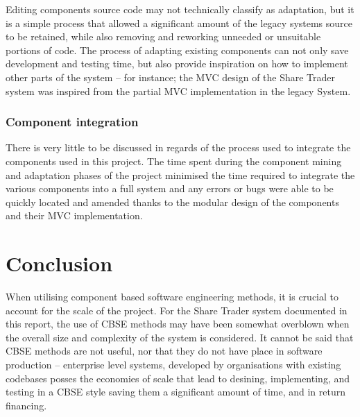 \documentclass[12pt, a4paper,titlepage]{article}
\begin{document}
Editing components source code may not technically classify as adaptation, but
it is a simple process that allowed a significant amount of the legacy systems
source to be retained, while also removing and reworking unneeded or
unsuitable portions of code. The process of adapting existing components can
not only save development and testing time, but also provide inspiration on
how to implement other parts of the system – for instance; the MVC design of
the Share Trader system was inspired from the partial MVC implementation in
the legacy System.

\subsubsection{Component integration}
There is very little to be discussed in regards of the process used to
integrate the components used in this project. The time spent during the
component mining and adaptation phases of the project minimised the time
required to integrate the various components into a full system and any errors
or bugs were able to be quickly located and amended thanks to the modular
design of the components and their MVC implementation.

\section{Conclusion}
When utilising component based software engineering methods, it is crucial to
account for the scale of the project. For the Share Trader system documented
in this report, the use of CBSE methods may have been somewhat overblown when
the overall size and complexity of the system is considered.  It cannot be
said that CBSE methods are not useful, nor that they do not have place in
software production – enterprise level systems, developed by organisations
with existing codebases posses the economies of scale that lead to desining,
implementing, and testing in a CBSE style saving them a significant amount of
time, and in return financing. 
\end{document}
